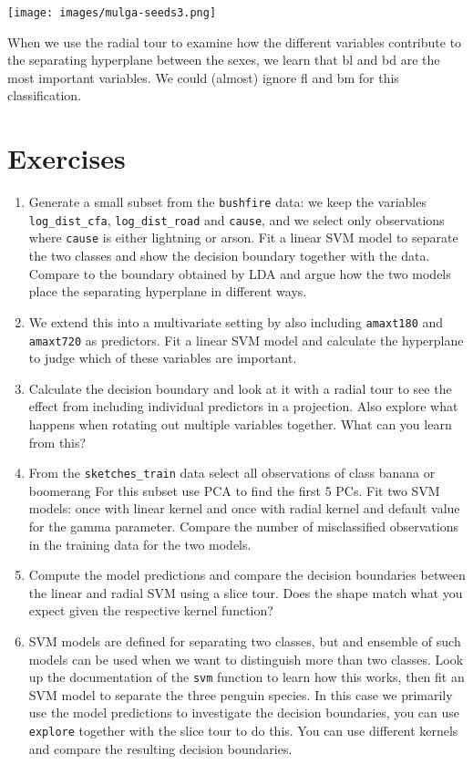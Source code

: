 \documentclass[
  letterpaper,
]{krantz}
\providecommand{\tightlist}{%
  \setlength{\itemsep}{0pt}\setlength{\parskip}{0pt}}\usepackage{longtable,booktabs,array}
\newcommand{\insightbox}[1]{%
\noindent\colorbox{insight!30}{%
\begin{minipage}{0.98\textwidth}%
    \centering%
    \begin{minipage}[c]{0.15\textwidth} %
      \texttt{[image: images/mulga-seeds3.png]} %
    \end{minipage}%
    \hfill %
    \begin{minipage}[c]{0.8\textwidth} %
      \bigskip%
      \textsf{#1}%
      \bigskip%
    \end{minipage}%
    \hspace*{3mm}%
  \end{minipage}%
}%
}
\begin{document}
\insightbox{When we use the radial tour to examine how the different variables contribute to the separating hyperplane between the sexes, we learn that {\textsf bl} and {\textsf bd} are the most important variables.  We could (almost) ignore {\textsf fl} and {\textsf bm} for this classification.}

\section*{Exercises}\label{exercises-15}


\begin{enumerate}
\def\labelenumi{\arabic{enumi}.}
\tightlist
\item
  Generate a small subset from the \texttt{bushfire} data: we keep the
  variables \texttt{log\_dist\_cfa}, \texttt{log\_dist\_road} and
  \texttt{cause}, and we select only observations where \texttt{cause}
  is either lightning or arson. Fit a linear SVM model to separate the
  two classes and show the decision boundary together with the data.
  Compare to the boundary obtained by LDA and argue how the two models
  place the separating hyperplane in different ways.
\item
  We extend this into a multivariate setting by also including
  \texttt{amaxt180} and \texttt{amaxt720} as predictors. Fit a linear
  SVM model and calculate the hyperplane to judge which of these
  variables are important.
\item
  Calculate the decision boundary and look at it with a radial tour to
  see the effect from including individual predictors in a projection.
  Also explore what happens when rotating out multiple variables
  together. What can you learn from this?
\item
  From the \texttt{sketches\_train} data select all observations of
  class banana or boomerang For this subset use PCA to find the first 5
  PCs. Fit two SVM models: once with linear kernel and once with radial
  kernel and default value for the gamma parameter. Compare the number
  of misclassified observations in the training data for the two models.
\item
  Compute the model predictions and compare the decision boundaries
  between the linear and radial SVM using a slice tour. Does the shape
  match what you expect given the respective kernel function?
\item
  SVM models are defined for separating two classes, but and ensemble of
  such models can be used when we want to distinguish more than two
  classes. Look up the documentation of the \texttt{svm} function to
  learn how this works, then fit an SVM model to separate the three
  penguin species. In this case we primarily use the model predictions
  to investigate the decision boundaries, you can use \texttt{explore}
  together with the slice tour to do this. You can use different kernels
  and compare the resulting decision boundaries.
\end{enumerate}
\end{document}
